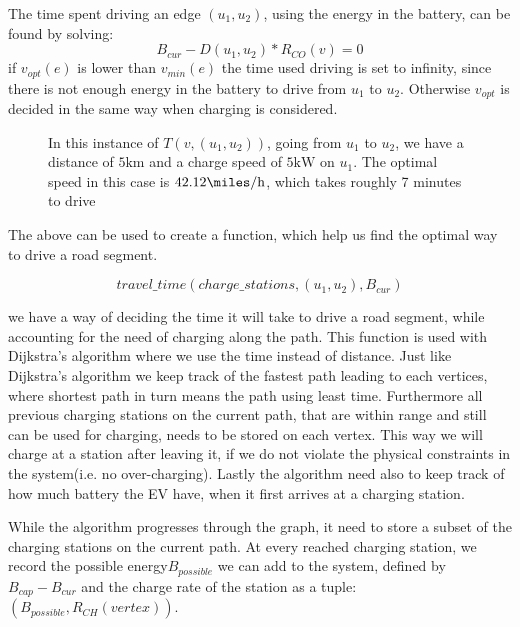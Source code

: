 The time spent driving an edge $(u_1, u_2)$, using the energy in the battery, can be found by solving:
\[B_{cur} - D(u_1, u_2) * R_{CO}(v) = 0\] 
if $v_{opt}(e)$ is lower than $v_{min}(e)$ the time used driving is set to infinity, since there is not enough energy in the battery to drive from $u_1$ to $u_2$. Otherwise $v_{opt}$ is decided in the same way when charging is considered.

\begin{figure}[!htb]
\label{fig:graph}
% 
\caption{In this instance of $T(v,(u_1, u_2))$, going from $u_1$ to $u_2$, we have a distance of $5 \si{\km}$ and a charge speed of $5 \si{\kW}$ on $u_1$. The optimal speed in this case is $42.12\si{\miles\per\hour}$, which takes roughly 7 minutes to drive}
\end{figure}

The above can be used to create a function, which help us find the optimal way to drive a road segment. 

\[travel\_time(charge\_stations, (u_1, u_2), B_{cur}) \]

we have a way of deciding the time it will take to drive a road segment, while accounting for the need of charging along the path. This function is used with Dijkstra's algorithm where we use the time instead of distance. Just like Dijkstra's algorithm we keep track of the fastest path leading to each vertices, where shortest path in turn means the path using least time. Furthermore all previous charging stations on the current path, that are within range and still can be used for charging, needs to be stored on each vertex. This way we will charge at a station after leaving it, if we do not violate the physical constraints in the system(i.e. no over-charging). Lastly the algorithm need also to keep track of how much battery the EV have, when it first arrives at a charging station.

While the algorithm progresses through the graph, it need to store a subset of the charging stations on the current path. At every reached charging station, we record the possible energy$B_{possible}$ we can add to the system, defined by $B_{cap}-B_{cur}$ and the charge rate of the station as a tuple: $(B_{possible}, R_{CH}(vertex))$.

